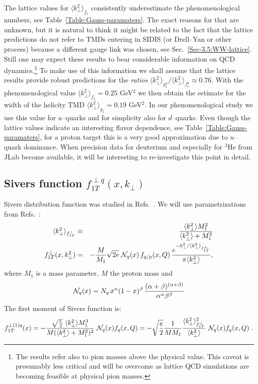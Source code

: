\documentclass[a4paper,11pt]{article}
\newcommand{\ba}{\begin{eqnarray}}
\newcommand{\ea}{\end{eqnarray}}
\newcommand{\la}{\langle}
\newcommand{\ra}{\rangle}
\def\kperp{k_\perp}
\def\avkperp{\la \kperp^2 \ra}
\begin{document}
The lattice values for $\langle \kperp^2 \rangle_{f_1}$ consistently 
underestimate the phenomenological numbers, see 
Table~\ref{Table:Gauss-paramaters}.
The exact reasons for that are unknown, but it is natural to think it
might be related to the fact that the lattice predictions \cite{Hagler:2009mb}
do not refer to TMDs entering in SIDIS (or Drell--Yan or other process) 
because a different gauge link was chosen, see Sec.~\ref{Sec-3.5:WW-lattice}. 
Still one may expect these results to bear considerable information 
on QCD dynamics.\footnote{
	The results \cite{Hagler:2009mb} refer also to pion masses above the 
	physical value. This caveat is presumably less critical and
	will be overcome as lattice QCD simulations are becoming feasible 
	at physical pion masses.}
To make use of this information we shall assume that the lattice results
\cite{Hagler:2009mb} provide robust predictions for the {\it ratios}
$\langle \kperp^2 \rangle_{g_1^u}/\langle \kperp^2 \rangle_{f_1^u}\approx 0.76$.
With the phenomenological value $\langle \kperp^2 \rangle_{f_1} = 0.25$ GeV$^2$ 
we then obtain the estimate for the width of the helicity TMD
$\langle \kperp^2 \rangle_{g_1} = 0.19$ GeV$^2$.
In our phenomenological study we use this value for $u$--quarks and for 
simplicity also for $d$--quarks. Even though the lattice values indicate 
an interesting flavor dependence, see Table~\ref{Table:Gauss-paramaters},
for a proton target this is a very good approximation due to $u$--quark 
dominance. When precision data for deuterium and especially for $^3$He
from JLab become available, it will be interesting to 
re-investigate this point in detail.

\subsection{\boldmath Sivers function $f_{1T}^{\perp q}(x,k_\perp)$}
\label{App:basis-f1Tperp}

Sivers distribution function was studied in Refs.~\cite{Efremov:2004tp,Anselmino:2008sga,Anselmino:2011gs,Anselmino:2011ch, Aybat:2011ge,Gamberg:2013kla,Bacchetta:2011gx,Anselmino:2012aa,Sun:2013dya,Echevarria:2014xaa}. 
We will use parametrizations from  Refs.~\cite{Anselmino:2008sga,Anselmino:2011gs,Anselmino:2011ch}:
\ba
 \avkperp_{f_{1T}^\perp} &\equiv& \frac{\avkperp M_1^2}{\avkperp + M_1^2} \\
f_{1T}^{\perp}(x, \kperp^2)& =& - \frac {M}{M_1} \sqrt{2e} \;
{\cal N}_q(x) \, f_{q/p} (x,Q) \, \frac{e^{-\kperp^2/{\avkperp_{f_{1T}^\perp}}}}{\pi \avkperp} ,
\label{fiTp}
\ea
%
where $M_1$ is a mass parameter, $M$ the proton mass and
%
\ba
{\cal N}_q(x)= N_q \, x^{\alpha} (1-x)^{\beta} \,
\frac{(\alpha + \beta)^{(\alpha +\beta)}}
{\alpha^{\alpha} \beta^{\beta}}
 \ea
The first moment of Sivers function is:
\ba
f_{1T}^{\perp (1) q}(x)  = -\frac{\sqrt{\frac{e}{2}} \ \avkperp M_1^3}{M (\avkperp + M_1^2)^2}  \ {\cal N}_q(x)  f_q(x, Q) = -\sqrt{\frac{e}{2}} \frac{1}{M M_1}  \frac{\avkperp_{f_{1T}^\perp}^2}{\avkperp}    \ {\cal N}_q(x)  f_q(x, Q)
\label{siversm} \ .
\ea
\end{document}
